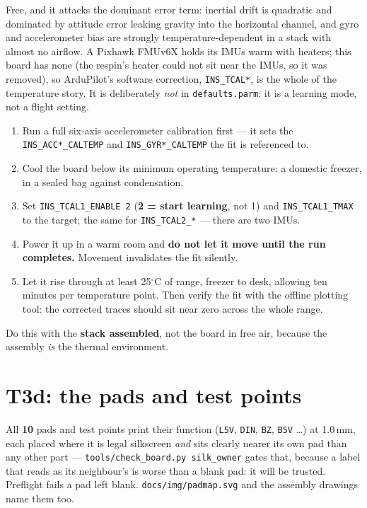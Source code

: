 \documentclass[11pt,a4paper]{article}
\newcommand{\file}[1]{\texttt{\small #1}}
\newcommand{\degC}{$^\circ$C}
\begin{document}
Free, and it attacks the dominant error term: inertial drift is quadratic and dominated by
attitude error leaking gravity into the horizontal channel, and gyro and accelerometer bias
are strongly temperature-dependent in a stack with almost no airflow. A Pixhawk FMUv6X holds
its IMUs warm with heaters; this board has none (the respin's heater could not sit near the
IMUs, so it was removed), so ArduPilot's software correction, \file{INS\_TCAL*}, is the
whole of the temperature story. It is deliberately \emph{not} in \file{defaults.parm}: it is a
learning mode, not a flight setting.

\begin{enumerate}
\item Run a full six-axis accelerometer calibration first --- it sets the
\file{INS\_ACC*\_CALTEMP} and \file{INS\_GYR*\_CALTEMP} the fit is referenced to.
\item Cool the board below its minimum operating temperature: a domestic freezer, in a
sealed bag against condensation.
\item Set \file{INS\_TCAL1\_ENABLE 2} (\textbf{2 = start learning}, not 1) and
\file{INS\_TCAL1\_TMAX} to the target; the same for \file{INS\_TCAL2\_*} --- there are two IMUs.
\item Power it up in a warm room and \textbf{do not let it move until the run completes.}
Movement invalidates the fit silently.
\item Let it rise through at least 25\degC{} of range, freezer to desk, allowing ten minutes
per temperature point. Then verify the fit with the offline plotting tool: the corrected
traces should sit near zero across the whole range.
\end{enumerate}

Do this with the \textbf{stack assembled}, not the board in free air, because the assembly
\emph{is} the thermal environment.

\section{T3d: the pads and test points}
\label{sec:T3d}

All \textbf{10} pads and test points print their function (\file{L5V}, \file{DIN}, \file{BZ},
\file{B5V} \dots) at 1.0\,mm, each placed where it is legal silkscreen \emph{and} sits clearly
nearer its own pad than any other part --- \file{tools/check\_board.py silk\_owner} gates
that, because a label that reads as its neighbour's is worse than a blank pad: it will be
trusted. Preflight fails a pad left blank. \file{docs/img/padmap.svg} and the assembly
drawings name them too.
\end{document}
